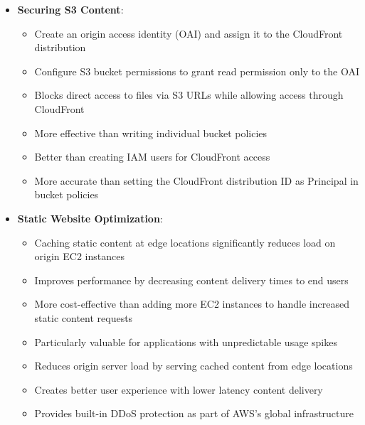 \documentclass[11pt,a4paper]{report}
\begin{document}
\begin{itemize}
\begin{itemize}
  \item More cost-effective than EC2 or Lambda-based solutions for serving static content
  \item Requires minimal infrastructure management as both services scale automatically
  \item Particularly effective for websites with unpredictable global traffic patterns
  \item Works seamlessly with S3 to deliver high-performance downloads to users worldwide
  \item Edge caching significantly reduces origin load and improves download speeds
  \item Optimizes bandwidth usage and reduces latency for global user base
  \item Provides better global performance than any single-region solution could offer
\end{itemize}
  \item \textbf{Securing S3 Content}:
\begin{itemize}
  \item Create an origin access identity (OAI) and assign it to the CloudFront distribution
  \item Configure S3 bucket permissions to grant read permission only to the OAI
  \item Blocks direct access to files via S3 URLs while allowing access through CloudFront
  \item More effective than writing individual bucket policies
  \item Better than creating IAM users for CloudFront access
  \item More accurate than setting the CloudFront distribution ID as Principal in bucket policies
\end{itemize}
  \item \textbf{Static Website Optimization}:
\begin{itemize}
  \item Caching static content at edge locations significantly reduces load on origin EC2 instances
  \item Improves performance by decreasing content delivery times to end users
  \item More cost-effective than adding more EC2 instances to handle increased static content requests
  \item Particularly valuable for applications with unpredictable usage spikes
  \item Reduces origin server load by serving cached content from edge locations
  \item Creates better user experience with lower latency content delivery
  \item Provides built-in DDoS protection as part of AWS's global infrastructure
\end{itemize}
\end{itemize}
\end{document}
